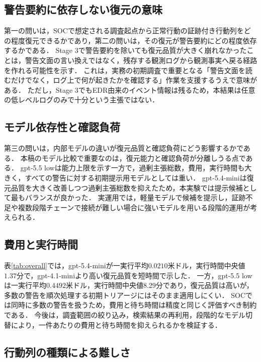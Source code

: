 \documentclass[a4paper,twocolumn,10pt]{article}
\newcommand{\code}[1]{{\small\ttfamily #1}}
\begin{document}
\subsection{警告要約に依存しない復元の意味}

第一の問いは，SOCで想定される調査起点から正常行動の証跡付き行動列をどの程度復元できるかであり，第二の問いは，その復元が警告要約にどの程度依存するかである．
Stage \(3\)で警告要約を除いても復元品質が大きく崩れなかったことは，警告文面の言い換えではなく，残存する観測ログから観測事実へ戻る経路を作れる可能性を示す．
これは，実務の初期調査で重要となる「警告文面を読むだけでなく，ログ上で何が起きたかを確認する」作業を支援するうえで意味がある．
ただし，Stage \(3\)でもEDR由来のイベント情報は残るため，本結果は任意の低レベルログのみで十分という主張ではない．

\subsection{モデル依存性と確認負荷}

第三の問いは，内部モデルの違いが復元品質と確認負荷にどう影響するかである．
本稿のモデル比較で重要なのは，復元能力と確認負荷が分離しうる点である．
\code{gpt-5.5 low}は能力上限を示す一方で，過剰主張総数，費用，実行時間も大きく，すべての警告に対する初期提示用モデルとしては重い．
\code{gpt-5.4-mini}は復元品質を大きく改善しつつ過剰主張総数を抑えたため，本実験では提示候補として最もバランスが良かった．
実運用では，軽量モデルで候補を提示し，証跡不足や複数段階チェーンで接続が難しい場合に強いモデルを用いる段階的運用が考えられる．

\subsection{費用と実行時間}

表\ref{tab:overall}では，\code{gpt-5.4-mini}が一実行平均\(0.0210\)米ドル，実行時間中央値\(1.37\)分で，\code{gpt-4.1-mini}より高い復元品質を短時間で示した．
一方，\code{gpt-5.5 low}は一実行平均\(0.4492\)米ドル，実行時間中央値\(8.29\)分であり，復元品質は高いが，多数の警告を順次処理する初期トリアージにはそのまま適用しにくい．
SOCでは同時に多数の警告を扱うため，費用と待ち時間は精度と同じく評価すべき制約である．
今後は，調査範囲の絞り込み，検索結果の再利用，段階的なモデル切替により，一件あたりの費用と待ち時間を抑えられるかを検証する．

\subsection{行動列の種類による難しさ}
\end{document}

